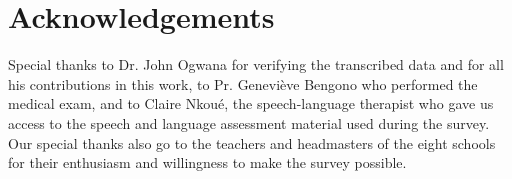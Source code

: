 \documentclass[output=paper,newtxmath,modfonts,nonflat,draftmode]{langsci/langscibook}
\begin{document}
\section*{Acknowledgements}

Special thanks to Dr. John Ogwana for verifying the transcribed data and for all his contributions in this work, to Pr. Geneviève Bengono who performed the medical exam, and to Claire Nkoué, the speech-language therapist who gave us access to the speech and language assessment material used during the survey. Our special thanks also go to the teachers and headmasters of the eight schools for their enthusiasm and willingness to make the survey possible.

{\sloppy
\printbibliography[heading=subbibliography,notkeyword=this] 
}
\end{document}
